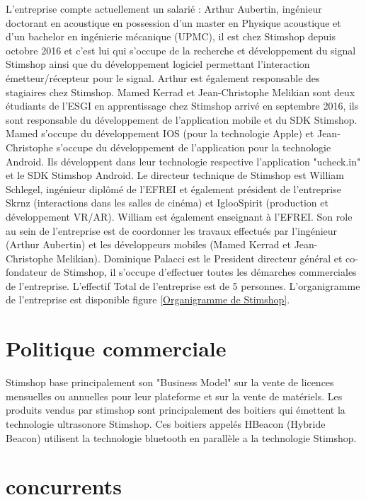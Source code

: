 \documentclass[12pt]{report}
\begin{document}
L'entreprise compte actuellement un salarié : Arthur Aubertin, ingénieur doctorant en acoustique en possession d'un master en Physique acoustique et d'un bachelor en ingénierie mécanique (UPMC), il est chez Stimshop depuis octobre 2016 et c'est lui qui s'occupe de la recherche et développement du signal Stimshop ainsi que du développement logiciel permettant l'interaction émetteur/récepteur pour le signal. Arthur est également responsable des stagiaires chez Stimshop. Mamed Kerrad et Jean-Christophe Melikian sont deux étudiants de l'ESGI en apprentissage chez Stimshop arrivé en septembre 2016, ils sont responsable du développement de l'application mobile et du SDK Stimshop. Mamed s'occupe du développement IOS (pour la technologie Apple) et Jean-Christophe s'occupe du développement de l'application pour la technologie Android. Ils développent dans leur technologie respective l'application "ucheck.in" et le SDK Stimshop Android. Le directeur technique de Stimshop est William Schlegel, ingénieur diplômé de l'EFREI et également président de l'entreprise Skrnz (interactions dans les salles de cinéma) et IglooSpirit (production et développement VR/AR). William est également enseignant à l'EFREI. Son role au sein de l'entreprise est de coordonner les travaux effectués par l'ingénieur (Arthur Aubertin) et les développeurs mobiles (Mamed Kerrad et Jean-Christophe Melikian). Dominique Palacci est le President directeur général et co-fondateur de Stimshop, il s'occupe d'effectuer toutes les démarches commerciales de l'entreprise. L'effectif Total de l'entreprise est de 5 personnes. L'organigramme de l'entreprise est disponible figure \ref{Organigramme de Stimshop}.

	\section{Politique commerciale}

Stimshop base principalement son "Business Model" sur la vente de licences mensuelles ou annuelles pour leur plateforme et sur la vente de matériels. Les produits vendus par stimshop sont principalement des boitiers qui émettent la technologie ultrasonore Stimshop. Ces boitiers appelés HBeacon (Hybride Beacon) utilisent la technologie bluetooth en parallèle a la technologie Stimshop.

	\section{concurrents}
\end{document}
